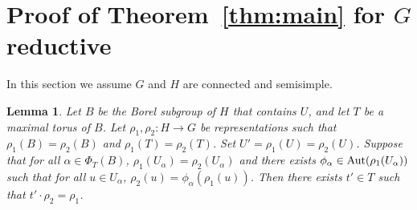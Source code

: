 \documentclass[12pt]{amsart}
\newcommand\ra{\rightarrow}
\numberwithin{equation}{section}
\newtheorem{lem}[equation]{Lemma}
\theoremstyle{definition}
\theoremstyle{remark}
\theoremstyle{remark}
\begin{document}
\section{Proof of Theorem~\ref{thm:main} for $G$ reductive}

In this section we assume $G$ and $H$ are connected and semisimple.

%

\begin{lem}
\label{lem:sameonrootgps}
 Let $B$ be the Borel subgroup of $H$ that contains $U$, and let $T$ be a maximal torus of $B$.  Let $\rho_1, \rho_2\colon H\ra G$ be representations such that $\rho_1(B)= \rho_2(B)$ and $\rho_1(T)= \rho_2(T)$.  Set $U'= \rho_1(U)= \rho_2(U)$.
 Suppose that for all $\alpha\in \Phi_T(B)$, $\rho_1(U_\alpha)= \rho_2(U_\alpha)$ and there exists $\phi_\alpha\in {\rm Aut}(\rho_1(U_\alpha))$ such that for all $u\in U_\alpha$, $\rho_2(u)= \phi_\alpha(\rho_1(u))$.
 Then there exists $t'\in T$ such that $t'\cdot \rho_2= \rho_1$.
\end{lem}
\end{document}
